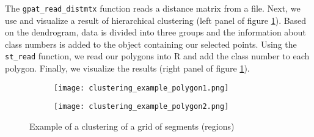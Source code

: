 The {\tt gpat\_read\_distmtx} function reads a distance matrix from a file. 
Next, we use and visualize a result of hierarchical clustering (left panel of figure \ref{FIG:CLUSTER_SEGMENT2}).
Based on the dendrogram, data is divided into three groups and the information about class numbers is added to the object containing our selected points.
Using the {\tt st\_read} function, we read our polygons into R and add the class number to each polygon.
Finally, we visualize the results (right panel of figure \ref{FIG:CLUSTER_SEGMENT2}).

\begin{figure}[H]
  \begin{subfigure}[b]{0.5\textwidth}
    \texttt{[image: clustering\_example\_polygon1.png]}
  \end{subfigure}
  \begin{subfigure}[b]{0.5\textwidth}
    \texttt{[image: clustering\_example\_polygon2.png]}
  \end{subfigure}
  \caption{Example of a clustering of a grid of segments (regions)}
  \label{FIG:CLUSTER_SEGMENT2}
\end{figure}


\newpage
